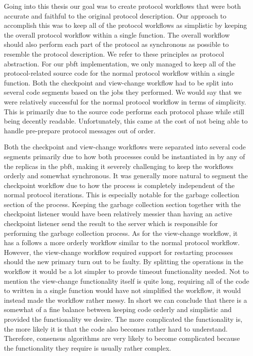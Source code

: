 \iffalse
Going into this thesis our goal was to create protocol workflows that were both accurate and faithful to the original protocol description. Our approach to accomplish this was to keep all of the protocol workflows as simplistic by keeping the overall protocol workflow within a single function. The overall workflow should also perform each part of the protocol as synchronous as possible to resemble the protocol description. We refer to these principles as protocol abstraction. For our \ac{pbft} implementation, we only managed to keep all of the protocol-related source code for the normal protocol workflow within a single function. Both the checkpoint and view-change workflow had to be split into several code segments based on the jobs they performed. We would say that we were relatively successful for the normal protocol workflow in terms of simplicity. This is primarily due to the source code performs each protocol phase while still being decently readable. Unfortunately, this came at the cost of not being able to handle pre-prepare protocol messages out of order.

Both the checkpoint and view-change workflows were separated into several code segments primarily due to how both processes could be instantiated in by any of the replicas in the \ac{pbft}, making it severely challenging to keep the workflows orderly and somewhat synchronous. It was generally more natural to segment the checkpoint workflow due to how the process is completely independent of the normal protocol iterations. This is especially notable for the garbage collection section of the process. Keeping the garbage collection section together with the checkpoint listener would have been relatively messier than having an active checkpoint listener send the result to the server which is responsible for performing the garbage collection process. As for the view-change workflow, it has a follows a more orderly workflow similar to the normal protocol workflow. However, the view-change workflow required support for restarting processes should the new primary turn out to be faulty. By splitting the operations in the workflow it would be a lot simpler to provde timeout functionality needed. Not to mention the view-change functionality itself is quite long, requiring all of the code to written in a single function would have not simplified the workflow, it would instead made the workflow rather messy. In short we can conclude that there is a somewhat of a fine balance between keeping code orderly and simplistic and provided the functionality we desire. The more complicated the functionality is, the more likely it is that the code also becomes rather hard to understand. Therefore, consensus algorithms are very likely to become complicated because the functionality they require is usually rather complex.
